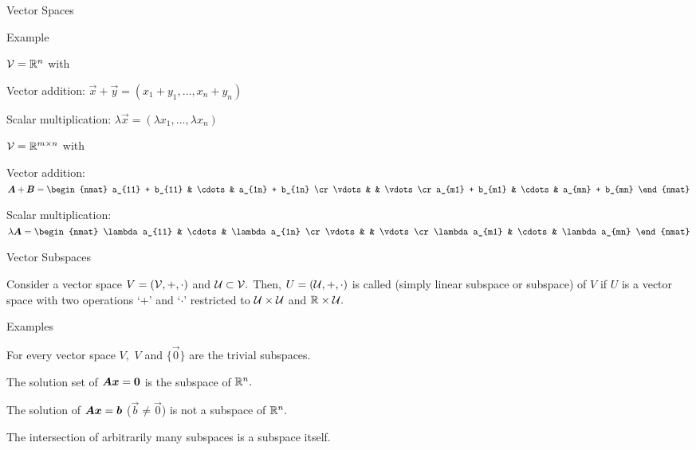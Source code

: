 \documentclass[handout,fleqn,aspectratio=169]{beamer}
\begin{document}
\begin{frame}{Vector Spaces}
\end{frame}

\begin{frame}{Example} 

\plitemsep 0.1in

\bci
\item  $\mathcal V = {\mathbb R}^n$ with 
\bci
\item Vector addition: $\vec{x} + \vec{y} = (x_1 + y_1, \ldots, x_n + y_n)$ 
\item Scalar multiplication: $\lambda \vec{x} = (\lambda x_1, \ldots, \lambda x_n)$
\eci

\bigskip
\item $\mathcal V = {\mathbb R}^{m \times n}$ with 
\bci
\item Vector addition: $\mat{A} + \vec{B} 
= 
\begin{nmat}
a_{11} + b_{11} & \cdots & a_{1n} + b_{1n} \cr
\vdots & & \vdots \cr
a_{m1} + b_{m1} & \cdots & a_{mn} + b_{mn}
\end{nmat}
$ 
\item Scalar multiplication: $\lambda\mat{A}
= 
\begin{nmat}
\lambda a_{11}  & \cdots & \lambda a_{1n} \cr
\vdots & & \vdots \cr
\lambda a_{m1}  & \cdots & \lambda a_{mn} 
\end{nmat}
$ 
\eci
\eci
\end{frame}

\begin{frame}{Vector Subspaces} 

 Consider a vector space $V=(\mathcal V,+,\cdot)$ and $\mathcal U \subset \mathcal V.$
Then, $U=(\mathcal U,+,\cdot)$ is called  (simply linear subspace or subspace) of $V$ if $U$ is a vector space with two operations `$+$' and `$\cdot$' restricted to $\mathcal U \times \mathcal U$ and ${\mathbb R} \times \mathcal U.$

\bigskip



\plitemsep 0.1in

Examples

\bci

\item For every vector space $V,$ $V$ and $\{\vec{0} \}$ are the trivial subspaces. 

\item The solution set of $\bm{A} \bm{x} = \bm{0}$ is the subspace of ${\mathbb R}^n.$

\item The solution of $\bm{A} \bm{x} = \bm{b}$ ($\vec{b} \neq \vec{0}$) is not a subspace of ${\mathbb R}^n.$

\item The intersection of arbitrarily many subspaces is a subspace itself. 
\eci
\end{frame}
\end{document}
